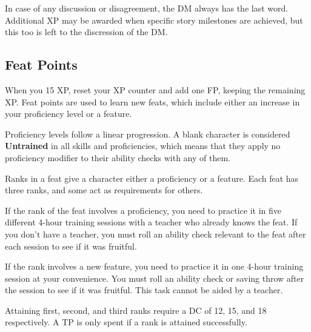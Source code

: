 In case of any discussion or disagreement, the DM always has the last word.
Additional XP may be awarded when specific story milestones are achieved, but this too is left to the discression of the DM.

\subsection*{Feat Points}
    When you 15 XP, reset your XP counter and add one FP, keeping the remaining XP.
    Feat points are used to learn new feats, which include either an increase in your proficiency level or a feature.

    Proficiency levels follow a linear progression.
    A blank character is considered \textbf{Untrained} in all skills and proficiencies, which means that they apply no proficiency modifier to their ability checks with any of them.






    Ranks in a feat give a character either a proficiency or a feature.
    Each feat has three ranks, and some act as requirements for others.





    If the rank of the feat involves a proficiency, you need to practice it in five different 4-hour training sessions with a teacher who already knows the feat.
    If you don't have a teacher, you must roll an ability check relevant to the feat after each session to see if it was fruitful.

    If the rank involves a new feature, you need to practice it in one 4-hour training session at your convenience.
    You must roll an ability check or saving throw after the session to see if it was fruitful.
    This task cannot be aided by a teacher.

    Attaining first, second, and third ranks require a DC of 12, 15, and 18 respectively.
    A TP is only spent if a rank is attained successfully.

